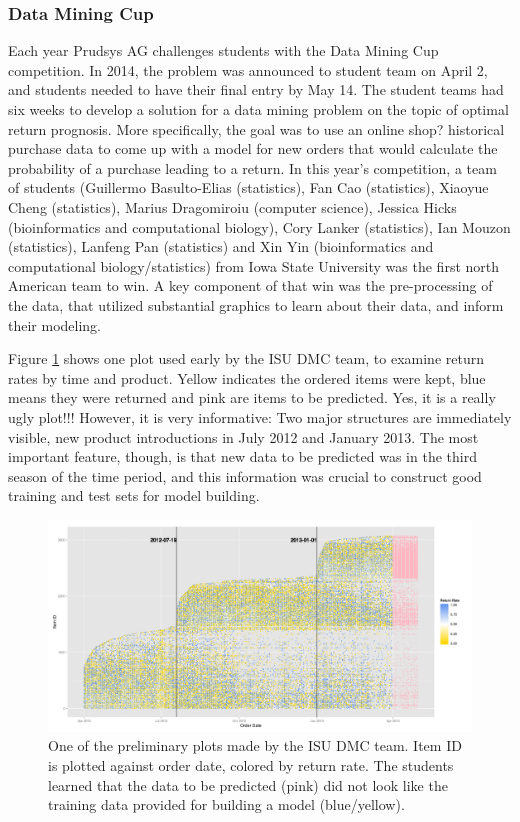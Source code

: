 \documentclass{article}
\begin{document}
\subsubsection{Data Mining Cup}

Each year Prudsys AG  challenges students with  the Data Mining Cup competition. In 2014, the problem was announced to student team on April 2, and students needed to have their final entry by May 14. The student teams had six weeks to develop a solution for a data mining problem on the topic of optimal return prognosis. More specifically, the goal was to use an online shop? historical purchase data to come up with a model for new orders that would calculate the probability of a purchase leading to a return. In this year's competition, a team of students (Guillermo Basulto-Elias (statistics), Fan Cao (statistics), Xiaoyue Cheng (statistics), Marius Dragomiroiu (computer science), Jessica Hicks (bioinformatics and computational biology), Cory Lanker (statistics), Ian Mouzon (statistics), Lanfeng Pan (statistics) and Xin Yin (bioinformatics and computational biology/statistics) from Iowa State University was the first north American team to win. A key component of that win was the pre-processing of the data, that utilized substantial graphics to learn about their data, and inform their modeling.

Figure \ref{DMC1} shows one plot used early by the ISU DMC team, to examine return rates by time and product. Yellow indicates the ordered items were kept, blue means they were returned and pink are items to be predicted. Yes, it is a really ugly plot!!! However, it is very informative: Two major structures are immediately visible, new product introductions in July 2012 and January 2013. The most important feature, though, is that new data to be predicted was in the third season of the time period, and this information was crucial to construct good training and test sets for model building.

\begin{figure}[htp]
\centerline{\includegraphics[width=7in]{images/orderDate_itemID.png}}
\caption{One of the preliminary plots made by the ISU DMC team. Item ID is plotted against order date, colored by return rate. The students learned that the data to be predicted (pink) did not look like the training data provided for building a model (blue/yellow).}
\label{DMC1}
\end{figure}
\end{document}
